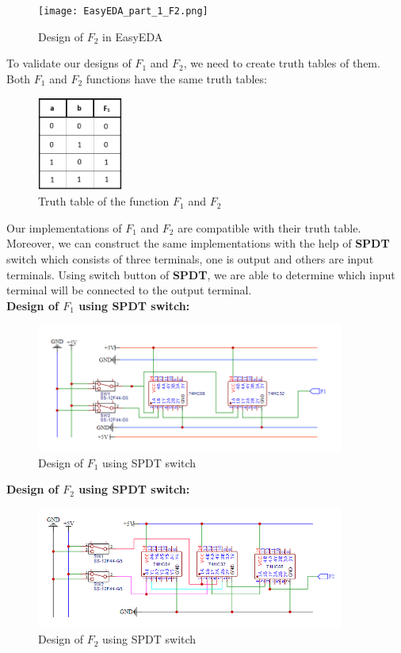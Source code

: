 \documentclass[pdftex,12pt,a4paper]{article}
\begin{document}
\begin{itemize}
   \begin{figure}[H]
    \centering
        \texttt{[image: EasyEDA\_part\_1\_F2.png]}	
        \caption{Design of \textbf{$F_2$} in EasyEDA}
   \end{figure}
   
 
   To validate our designs of $F_1$ and $F_2$, we need to create truth tables of them. Both $F_1$ and $F_2$ functions have the same truth tables:\\
   \begin{figure}[H]
    \centering
        \includegraphics[width=0.25\textwidth]{f1truth.png}	
        \caption{Truth table of the function \textbf{$F_1$} and \textbf{$F_2$}}
   \end{figure}
   Our implementations of $F_1$ and $F_2$ are compatible with their truth table.\\
   Moreover, we can construct the same implementations with the help of \textbf{SPDT} switch which consists of three terminals, one is output and others are input terminals. Using switch button of \textbf{SPDT}, we are able to determine which input terminal will be connected to the output terminal.\\

   \textbf{Design of $F_1$ using SPDT switch:}\\
   \begin{figure}[H]
    \centering
        \includegraphics[width=0.9\textwidth]{F1ICspdt.png}	
        \caption{Design of $F_1$ using SPDT switch}
        \label{fig1}
   \end{figure}
   \textbf{Design of $F_2$ using SPDT switch:}\\
   \begin{figure}[H]
    \centering
        \includegraphics[width=0.9\textwidth]{F2ICspdt.png}	
        \caption{Design of $F_2$ using SPDT switch}
        

\end{figure}
\end{itemize}
\end{document}
